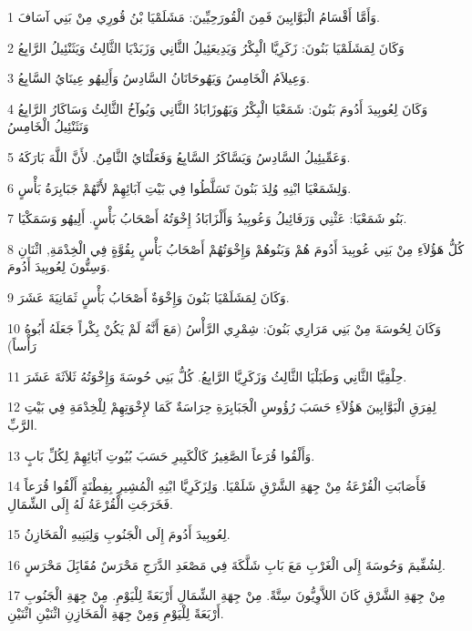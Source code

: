\par 1 وَأَمَّا أَقْسَامُ الْبَوَّابِينَ فَمِنَ الْقُورَحِيِّينَ: مَشَلَمْيَا بْنُ قُورِي مِنْ بَنِي آسَافَ.
\par 2 وَكَانَ لِمَشَلَمْيَا بَنُونَ: زَكَرِيَّا الْبِكْرُ وَيَدِيعَئِيلُ الثَّانِي وَزَبَدْيَا الثَّالِثُ وَيَثَنْئِيلُ الرَّابِعُ
\par 3 وَعِيلاَمُ الْخَامِسُ وَيَهُوحَانَانُ السَّادِسُ وَأَلِيهُو عِينَايُ السَّابِعُ.
\par 4 وَكَانَ لِعُوبِيدَ أَدُومَ بَنُونَ: شَمَعْيَا الْبِكْرُ وَيَهُوزَابَادُ الثَّانِي وَيُوآخُ الثَّالِثُ وَسَاكَارُ الرَّابِعُ وَنَثَنْئِيلُ الْخَامِسُ
\par 5 وَعَمِّيئِيلُ السَّادِسُ وَيَسَّاكَرُ السَّابِعُ وَفَعَلْتَايُ الثَّامِنُ. لأَنَّ اللَّهَ بَارَكَهُ.
\par 6 وَلِشَمَعْيَا ابْنِهِ وُلِدَ بَنُونَ تَسَلَّطُوا فِي بَيْتِ آبَائِهِمْ لأَنَّهُمْ جَبَابِرَةُ بَأْسٍ.
\par 7 بَنُو شَمَعْيَا: عَثْنِي وَرَفَائِيلُ وَعُوبِيدُ وَأَلْزَابَادُ إِخْوَتُهُ أَصْحَابُ بَأْسٍ. أَلِيهُو وَسَمَكْيَا.
\par 8 كُلُّ هَؤُلاَءِ مِنْ بَنِي عُوبِيدَ أَدُومَ هُمْ وَبَنُوهُمْ وَإِخْوَتُهُمْ أَصْحَابُ بَأْسٍ بِقُوَّةٍ فِي الْخِدْمَةِ, اثْنَانِ وَسِتُّونَ لِعُوبِيدَ أَدُومَ.
\par 9 وَكَانَ لِمَشَلَمْيَا بَنُونَ وَإِخْوَةٌ أَصْحَابُ بَأْسٍ ثَمَانِيَةَ عَشَرَ.
\par 10 وَكَانَ لِحُوسَةَ مِنْ بَنِي مَرَارِي بَنُونَ: شِمْرِي الرَّأْسُ (مَعَ أَنَّهُ لَمْ يَكُنْ بِكْراً جَعَلَهُ أَبُوهُ رَأْساً)
\par 11 حِلْقِيَّا الثَّانِي وَطَبَلْيَا الثَّالِثُ وَزَكَرِيَّا الرَّابِعُ. كُلُّ بَنِي حُوسَةَ وَإِخْوَتُهُ ثَلاَثَةَ عَشَرَ.
\par 12 لِفِرَقِ الْبَوَّابِينَ هَؤُلاَءِ حَسَبَ رُؤُوسِ الْجَبَابِرَةِ حِرَاسَةٌ كَمَا لإِخْوَتِهِمْ لِلْخِدْمَةِ فِي بَيْتِ الرَّبِّ.
\par 13 وَأَلْقُوا قُرَعاً الصَّغِيرُ كَالْكَبِيرِ حَسَبَ بُيُوتِ آبَائِهِمْ لِكُلِّ بَابٍ.
\par 14 فَأَصَابَتِ الْقُرْعَةُ مِنْ جِهَةِ الشَّرْقِ شَلَمْيَا. وَلِزَكَرِيَّا ابْنِهِ الْمُشِيرِ بِفِطْنَةٍ أَلْقُوا قُرَعاً فَخَرَجَتِ الْقُرْعَةُ لَهُ إِلَى الشِّمَالِ.
\par 15 لِعُوبِيدَ أَدُومَ إِلَى الْجَنُوبِ وَلِبَنِيهِ الْمَخَازِنُ.
\par 16 لِشُفِّيمَ وَحُوسَةَ إِلَى الْغَرْبِ مَعَ بَابِ شَلَّكَةَ فِي مَصْعَدِ الدَّرَجِ مَحْرَسٌ مُقَابَِلَ مَحْرَسٍ.
\par 17 مِنْ جِهَةِ الشَّرْقِ كَانَ اللاَّوِيُّونَ سِتَّةً. مِنْ جِهَةِ الشِّمَالِ أَرْبَعَةً لِلْيَوْمِ. مِنْ جِهَةِ الْجَنُوبِ أَرْبَعَةً لِلْيَوْمِ وَمِنْ جِهَةِ الْمَخَازِنِ اثْنَيْنِ اثْنَيْنِ.
